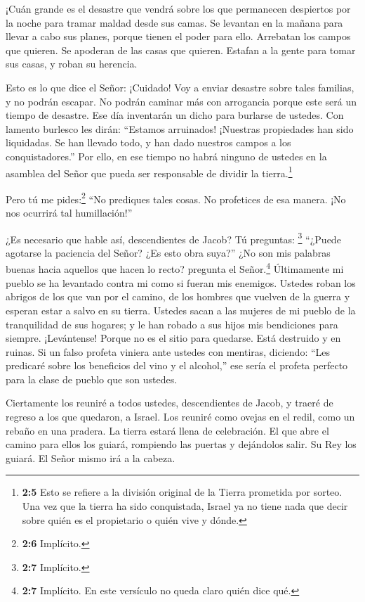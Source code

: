  ¡Cuán grande es el desastre que vendrá sobre los que
permanecen despiertos por la noche para tramar maldad desde sus camas.
Se levantan en la mañana para llevar a cabo sus planes, porque tienen el
poder para ello.  Arrebatan los campos que quieren. Se
apoderan de las casas que quieren. Estafan a la gente para tomar sus
casas, y roban su herencia.

 Esto es lo que dice el Señor: ¡Cuidado! Voy a enviar
desastre sobre tales familias, y no podrán escapar. No podrán caminar
más con arrogancia porque este será un tiempo de desastre. 
Ese día inventarán un dicho para burlarse de ustedes. Con lamento
burlesco les dirán: ``Estamos arruinados! ¡Nuestras propiedades han sido
liquidadas. Se han llevado todo, y han dado nuestros campos a los
conquistadores.''  Por ello, en ese tiempo no habrá ninguno
de ustedes en la asamblea del Señor que pueda ser responsable de dividir
la tierra.\footnote{\textbf{2:5} Esto se refiere a la división original
  de la Tierra prometida por sorteo. Una vez que la tierra ha sido
  conquistada, Israel ya no tiene nada que decir sobre quién es el
  propietario o quién vive y dónde.}

 Pero tú me pides:\footnote{\textbf{2:6} Implícito.} ``No
prediques tales cosas. No profetices de esa manera. ¡No nos ocurrirá tal
humillación!''

 ¿Es necesario que hable así, descendientes de Jacob? Tú
preguntas: \footnote{\textbf{2:7} Implícito.} ``¿Puede agotarse la
paciencia del Señor? ¿Es esto obra suya?'' ¿No son mis palabras buenas
hacia aquellos que hacen lo recto? pregunta el Señor.\footnote{\textbf{2:7}
  Implícito. En este versículo no queda claro quién dice qué.}
 Últimamente mi pueblo se ha levantado contra mi como si
fueran mis enemigos. Ustedes roban los abrigos de los que van por el
camino, de los hombres que vuelven de la guerra y esperan estar a salvo
en su tierra.  Ustedes sacan a las mujeres de mi pueblo de
la tranquilidad de sus hogares; y le han robado a sus hijos mis
bendiciones para siempre.  ¡Levántense! Porque no es el
sitio para quedarse. Está destruido y en ruinas.  Si un
falso profeta viniera ante ustedes con mentiras, diciendo: ``Les
predicaré sobre los beneficios del vino y el alcohol,'' ese sería el
profeta perfecto para la clase de pueblo que son ustedes.

 Ciertamente los reuniré a todos ustedes, descendientes de
Jacob, y traeré de regreso a los que quedaron, a Israel. Los reuniré
como ovejas en el redil, como un rebaño en una pradera. La tierra estará
llena de celebración.  El que abre el camino para ellos los
guiará, rompiendo las puertas y dejándolos salir. Su Rey los guiará. El
Señor mismo irá a la cabeza.

